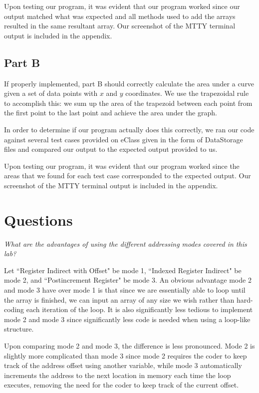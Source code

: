 \documentclass[10pt, letterpaper, titlepage]{article} %
\begin{document}
\begin{multicols*}{2}
Upon testing our program, it was evident that our program worked since our output matched what was expected and all methods used to add the arrays resulted in the same resultant array. Our screenshot of the MTTY terminal output is included in the appendix.

\subsection{Part B}
If properly implemented, part B should correctly calculate the area under a curve given a set of data points with $x$ and $y$ coordinates. We use the trapezoidal rule to accomplish this: we sum up the area of the trapezoid between each point from the first point to the last point and achieve the area under the graph. 

In order to determine if our program actually does this correctly, we ran our code against several test cases provided on eClass given in the form of DataStorage files and compared our output to the expected output provided to us. 

Upon testing our program, it was evident that our program worked since the areas that we found for each test case corresponded to the expected output. Our screenshot of the MTTY terminal output is included in the appendix.

\section{Questions}
\textit{What are the advantages of using the different addressing modes covered in this lab?}

Let ``Register Indirect with Offset" be mode 1, ``Indexed Register Indirect" be mode 2, and ``Postincrement Register" be mode 3. 
An obvious advantage mode 2 and mode 3 have over mode 1 is that since we are essentially able to loop until the array is finished, we can input an array of any size we wish rather than hard-coding each iteration of the loop. 
It is also significantly less tedious to implement mode 2 and mode 3 since significantly less code is needed when using a loop-like structure. 

Upon comparing mode 2 and mode 3, the difference is less pronounced. 
Mode 2 is slightly more complicated than mode 3 since mode 2 requires the coder to keep track of the address offset using another variable, while mode 3 automatically increments the address to the next location in memory each time the loop executes, removing the need for the coder to keep track of the current offset.


\end{multicols*}
\end{document}

